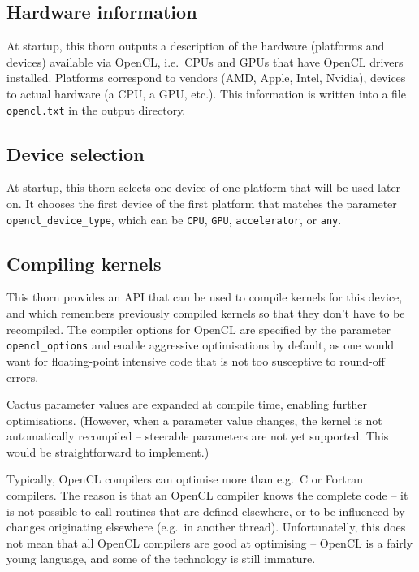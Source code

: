 \subsection{Hardware information}

At startup, this thorn outputs a description of the hardware
(platforms and devices) available via OpenCL, i.e.\ CPUs and GPUs that
have OpenCL drivers installed. Platforms correspond to vendors (AMD,
Apple, Intel, Nvidia), devices to actual hardware (a CPU, a GPU,
etc.). This information is written into a file \texttt{opencl.txt} in
the output directory.

\subsection{Device selection}

At startup, this thorn selects one device of one platform that will be
used later on. It chooses the first device of the first platform that
matches the parameter \texttt{opencl\_device\_type}, which can be
\texttt{CPU}, \texttt{GPU}, \texttt{accelerator}, or \texttt{any}.

\subsection{Compiling kernels}

This thorn provides an API that can be used to compile kernels for
this device, and which remembers previously compiled kernels so that
they don't have to be recompiled. The compiler options for OpenCL are
specified by the parameter \texttt{opencl\_options} and enable
aggressive optimisations by default, as one would want for
floating-point intensive code that is not too susceptive to round-off
errors.

Cactus parameter values are expanded at compile time, enabling further
optimisations. (However, when a parameter value changes, the kernel is
not automatically recompiled -- steerable parameters are not yet
supported. This would be straightforward to implement.)

Typically, OpenCL compilers can optimise more than e.g.\ C or Fortran
compilers. The reason is that an OpenCL compiler knows the complete
code -- it is not possible to call routines that are defined
elsewhere, or to be influenced by changes originating elsewhere
(e.g.\ in another thread). Unfortunatelly, this does not mean that all
OpenCL compilers are good at optimising -- OpenCL is a fairly young
language, and some of the technology is still immature.

